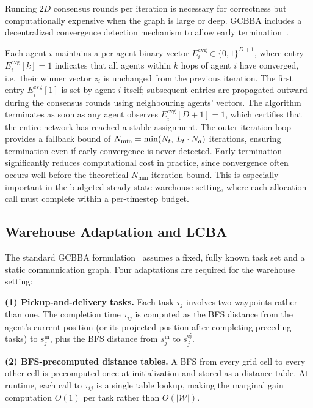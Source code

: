 Running $2D$ consensus rounds per iteration is necessary for correctness but
computationally expensive when the graph is large or deep.
GCBBA includes a decentralized convergence detection mechanism to allow early
termination~\cite{kha2025enhancing}.

Each agent $i$ maintains a per-agent binary vector
$E^{\text{cvg}}_i \in \{0,1\}^{D+1}$, where entry $E^{\text{cvg}}_i[k] = 1$
indicates that all agents within $k$ hops of agent $i$ have converged,
i.e.\ their winner vector $z_i$ is unchanged from the previous iteration.
The first entry $E^{\text{cvg}}_i[1]$ is set by agent $i$ itself; subsequent
entries are propagated outward during the consensus rounds using neighbouring
agents' vectors.
The algorithm terminates as soon as any agent observes
$E^{\text{cvg}}_i[D+1] = 1$, which certifies that the entire network has
reached a stable assignment.
The outer iteration loop provides a fallback bound of $N_{\min} = \min(N_t,\,L_t\cdot N_a)$
iterations, ensuring termination even if early convergence is never detected.
Early termination significantly reduces computational cost in practice, since
convergence often occurs well before the theoretical $N_{\min}$-iteration bound.
This is especially important in the budgeted steady-state warehouse setting,
where each allocation call must complete within a per-timestep budget.


\subsection{Warehouse Adaptation and LCBA}
\label{subsec:method_warehouse_adaptation}

The standard GCBBA formulation~\cite{kha2025enhancing} assumes a fixed, fully
known task set and a static communication graph.
Four adaptations are required for the warehouse setting:

\textbf{(1) Pickup-and-delivery tasks.}
Each task $\tau_j$ involves two waypoints rather than one.
The completion time $\tau_{ij}$ is computed as the BFS distance from the
agent's current position (or its projected position after completing preceding
tasks) to $s_j^{\text{in}}$, plus the BFS distance from $s_j^{\text{in}}$ to
$s_j^{\text{ej}}$.

\textbf{(2) BFS-precomputed distance tables.}
A BFS from every grid cell to every other cell is precomputed once at
initialization and stored as a distance table.
At runtime, each call to $\tau_{ij}$ is a single table lookup, making the
marginal gain computation $O(1)$ per task rather than $O(|\mathcal{W}|)$.

